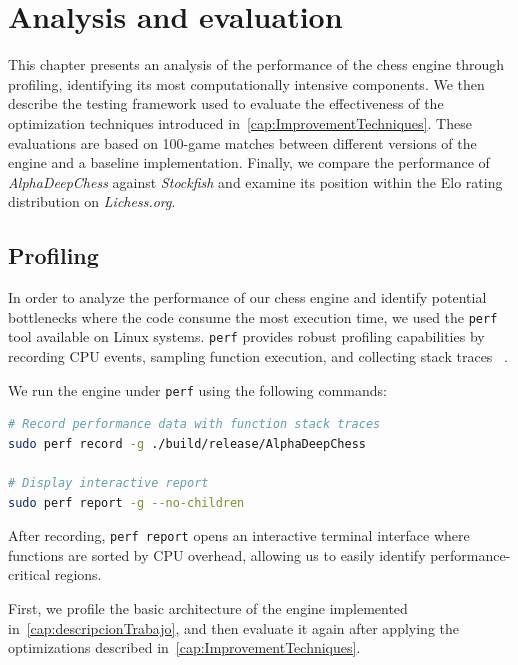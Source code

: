 \chapter{Analysis and evaluation}\label{cap:analysis}

This chapter presents an analysis of the performance of the chess engine through profiling, identifying its most computationally intensive components. We then describe the testing framework used to evaluate the effectiveness of the optimization techniques introduced in~\cref{cap:ImprovementTechniques}. These evaluations are based on 100-game matches between different versions of the engine and a baseline implementation. Finally, we compare the performance of \textit{AlphaDeepChess} against \textit{Stockfish} and examine its position within the Elo rating distribution on \textit{Lichess.org}.

\section{Profiling}
In order to analyze the performance of our chess engine and identify potential bottlenecks where the code consume the most execution time, we used the \texttt{perf} tool available on Linux systems. \texttt{perf} provides robust profiling capabilities by recording CPU events, sampling function execution, and collecting stack traces ~\cite{PerfLinux}. 

\vspace{1em}

\noindent We run the engine under \texttt{perf} using the following commands:

\begin{lstlisting}[language=bash, caption={Profiling \textit{AlphaDeepChess} with perf}, frame=single, breaklines=true]
# Record performance data with function stack traces
sudo perf record -g ./build/release/AlphaDeepChess

# Display interactive report
sudo perf report -g --no-children
\end{lstlisting}

\noindent After recording, \texttt{perf report} opens an interactive terminal interface where functions are sorted by CPU overhead, allowing us to easily identify performance-critical regions.

\vspace{2em}

\noindent First, we profile the basic architecture of the engine implemented in~\cref{cap:descripcionTrabajo}, and then evaluate it again after applying the optimizations described in~\cref{cap:ImprovementTechniques}.

